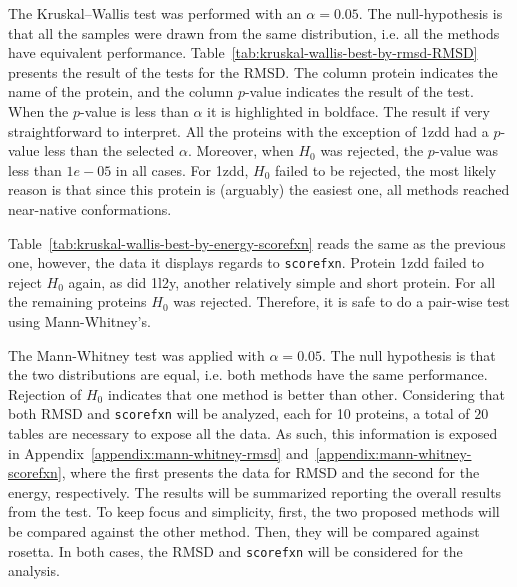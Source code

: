 The Kruskal–Wallis test was performed with an $\alpha = 0.05$. The null-hypothesis
is that all the samples were drawn from the same distribution, i.e. all the
methods have equivalent performance.
Table~\ref{tab:kruskal-wallis-best-by-rmsd-RMSD} presents the result of the
tests for the RMSD.
The column protein indicates the name of the protein, and the column
$p$-value indicates the result of the test. When the $p$-value is less than
$\alpha$ it is highlighted in boldface. The result if very straightforward to
interpret. All the proteins with the exception of 1zdd had a $p$-value less
than the selected $\alpha$. Moreover, when $H_0$ was rejected, the $p$-value
was less than $1e-05$ in all cases. For 1zdd, $H_0$ failed to be rejected, the
most likely reason is that since this protein is (arguably) the easiest one,
all methods reached near-native conformations.

Table~\ref{tab:kruskal-wallis-best-by-energy-scorefxn} reads the same
as the previous one, however, the data it displays regards to \texttt{scorefxn}.
Protein 1zdd failed to reject $H_0$ again, as did 1l2y, another relatively
simple and short protein. For all the remaining proteins $H_0$ was rejected.
Therefore, it is safe to do a pair-wise test using Mann-Whitney's.



The Mann-Whitney test was applied with $\alpha = 0.05$. The null hypothesis is
that the two distributions are equal, i.e. both methods have the same
performance. Rejection of $H_0$ indicates that one method is better than other.
Considering that both RMSD and \texttt{scorefxn} will be analyzed, each for
10 proteins, a total of $20$ tables are necessary to expose all the data. As
such, this information is exposed in Appendix~\ref{appendix:mann-whitney-rmsd}
and~\ref{appendix:mann-whitney-scorefxn}, where the first presents the data for
RMSD and the second for the energy, respectively. The results will be summarized reporting the
overall results from the test. To keep focus and simplicity, first, the two
proposed methods will be compared against the other method. Then, they will be
compared against rosetta. In both cases, the RMSD and \texttt{scorefxn} will be
considered for the analysis.




